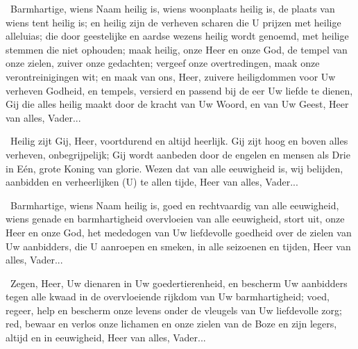 \documentclass[12pt,twoside,a5paper]{article}
\begin{document}
\begin{halfparskip}
   \cc~Barmhartige, wiens Naam heilig is, wiens woonplaats heilig is, de plaats van wiens tent heilig is; en heilig zijn de verheven scharen die U prijzen met heilige alleluias; die door geestelijke en aardse wezens heilig wordt genoemd, met heilige stemmen die niet ophouden; maak heilig, onze Heer en onze God, de tempel van onze zielen, zuiver onze gedachten; vergeef onze overtredingen, maak onze verontreinigingen wit; en maak van ons, Heer, zuivere heiligdommen voor Uw verheven Godheid, en tempels, versierd en passend bij de eer Uw liefde te dienen, Gij die alles heilig maakt door de kracht van Uw Woord, en
  van Uw Geest, Heer van alles, Vader...

  \cc~Heilig zijt Gij, Heer, voortdurend en altijd heerlijk. Gij zijt hoog en boven alles verheven, onbegrijpelijk; Gij wordt aanbeden door de engelen en mensen als Drie in Eén, grote Koning van glorie. Wezen dat van alle eeuwigheid is, wij belijden, aanbidden en verheerlijken (U) te allen tijde, Heer van alles, Vader...
\end{halfparskip}

\begin{halfparskip}
   \cc~Barmhartige, wiens Naam heilig is, goed en rechtvaardig van alle eeuwigheid, wiens genade en barmhartigheid overvloeien van alle eeuwigheid, stort uit, onze Heer en onze God, het mededogen van Uw liefdevolle goedheid over de zielen van Uw aanbidders, die U aanroepen en smeken, in alle seizoenen en tijden, Heer van alles, Vader...

  \cc~Zegen, Heer, Uw dienaren in Uw goedertierenheid, en bescherm Uw aanbidders tegen alle kwaad in de overvloeiende rijkdom van Uw barmhartigheid; voed, regeer, help en bescherm onze levens onder de vleugels van Uw liefdevolle zorg; red, bewaar en verlos onze lichamen en onze zielen van de Boze en zijn legers, altijd en in eeuwigheid, Heer van alles, Vader...
\end{halfparskip}



\end{document}
